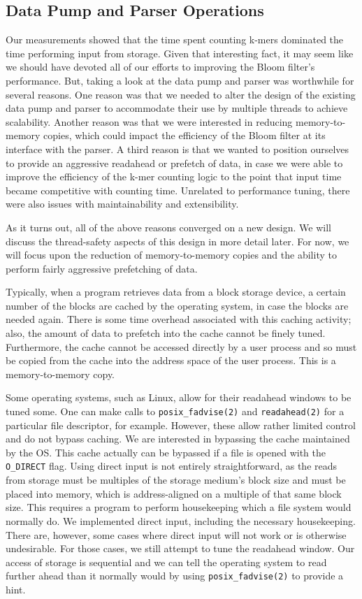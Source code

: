 \documentclass{article}
\begin{document}
\subsection{Data Pump and Parser Operations}

Our measurements showed that the time spent counting k-mers dominated the time performing input from storage. Given that interesting fact, it may seem like we should have devoted all of our efforts to improving the Bloom filter's performance. But, taking a look at the data pump and parser was worthwhile for several reasons. One reason was that we needed to alter the design of the existing data pump and parser to accommodate their use by multiple threads to achieve scalability. Another reason was that we were interested in reducing memory-to-memory copies, which could impact the efficiency of the Bloom filter at its interface with the parser. A third reason is that we wanted to position ourselves to provide an aggressive readahead or prefetch of data, in case we were able to improve the efficiency of the k-mer counting logic to the point that input time became competitive with counting time. Unrelated to performance tuning, there were also issues with maintainability and extensibility.

As it turns out, all of the above reasons converged on a new design. We will discuss the thread-safety aspects of this design in more detail later. For now, we will focus upon the reduction of memory-to-memory copies and the ability to perform fairly aggressive prefetching of data.

Typically, when a program retrieves data from a block storage device, a certain number of the blocks are cached by the operating system, in case the blocks are needed again. There is some time overhead associated with this caching activity; also, the amount of data to prefetch into the cache cannot be finely tuned. Furthermore, the cache cannot be accessed directly by a user process and so must be copied from the cache into the address space of the user process. This is a memory-to-memory copy. 

Some operating systems, such as Linux, allow for their readahead windows to be tuned some. One can make calls to \texttt{posix\_fadvise(2)} and \texttt{readahead(2)} for a particular file descriptor, for example. However, these allow rather limited control and do not bypass caching. We are interested in bypassing the cache maintained by the OS. This cache actually can be bypassed if a file is opened with the \texttt{O\_DIRECT} flag. Using direct input is not entirely straightforward, as the reads from storage must be multiples of the storage medium's block size and must be placed into memory, which is address-aligned on a multiple of that same block size. This requires a program to perform housekeeping which a file system would normally do. We implemented direct input, including the necessary housekeeping. There are, however, some cases where direct input will not work or is otherwise undesirable. For those cases, we still attempt to tune the readahead window. Our access of storage is sequential and we can tell the operating system to read further ahead than it normally would by using \texttt{posix\_fadvise(2)} to provide a hint.
\end{document}
